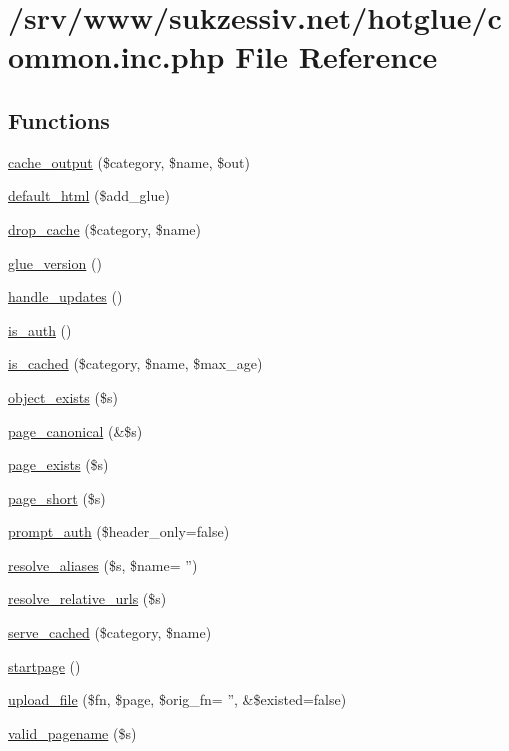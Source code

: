 \hypertarget{common_8inc_8php}{
\section{/srv/www/sukzessiv.net/hotglue/common.inc.php File Reference}
\label{common_8inc_8php}
}
\subsection*{Functions}
\begin{CompactItemize}
\item 
\hyperlink{common_8inc_8php_6cceb5c6a3c421c18e925515c78f6dfd}{cache\_\-output} (\$category, \$name, \$out)
\item 
\hyperlink{common_8inc_8php_8916cb6ec34ceeb3f48c86655c305974}{default\_\-html} (\$add\_\-glue)
\item 
\hyperlink{common_8inc_8php_7ca47f8aab349971cde2d4b02441cf41}{drop\_\-cache} (\$category, \$name)
\item 
\hyperlink{common_8inc_8php_0d6d0da45f4adf6283bcccec9fd107e3}{glue\_\-version} ()
\item 
\hyperlink{common_8inc_8php_a8712e8d1a52e2b8f00ecaf839205d24}{handle\_\-updates} ()
\item 
\hyperlink{common_8inc_8php_b3abbb2cd13e01231533e7cdc93da6db}{is\_\-auth} ()
\item 
\hyperlink{common_8inc_8php_6fb34b9210b43349ca3eb16b2738a28b}{is\_\-cached} (\$category, \$name, \$max\_\-age)
\item 
\hyperlink{common_8inc_8php_3d71a269e01b98748fb57719feef27be}{object\_\-exists} (\$s)
\item 
\hyperlink{common_8inc_8php_31ed04b0c90ac3077e71743c307d45f8}{page\_\-canonical} (\&\$s)
\item 
\hyperlink{common_8inc_8php_a71868111dd5b8af98df9cc9c968e523}{page\_\-exists} (\$s)
\item 
\hyperlink{common_8inc_8php_da968adfb989aa09adaf29867208f1ab}{page\_\-short} (\$s)
\item 
\hyperlink{common_8inc_8php_80c23c9d8ac02159151d6368506b1b54}{prompt\_\-auth} (\$header\_\-only=false)
\item 
\hyperlink{common_8inc_8php_78992fdfae6cd9d7d4e8053d004d1709}{resolve\_\-aliases} (\$s, \$name= '')
\item 
\hyperlink{common_8inc_8php_81eb70073067db81ab43829870f15e6d}{resolve\_\-relative\_\-urls} (\$s)
\item 
\hyperlink{common_8inc_8php_ac90387dcab722e243df2d083f8d6a00}{serve\_\-cached} (\$category, \$name)
\item 
\hyperlink{common_8inc_8php_0a3ee1e9beca572266648f17b9c4c75f}{startpage} ()
\item 
\hyperlink{common_8inc_8php_4659077c34b709eec75f9897ea07e55a}{upload\_\-file} (\$fn, \$page, \$orig\_\-fn= '', \&\$existed=false)
\item 
\hyperlink{common_8inc_8php_0ef613d233a6e62f7e631b8dfcd710bf}{valid\_\-pagename} (\$s)
\end{CompactItemize}


